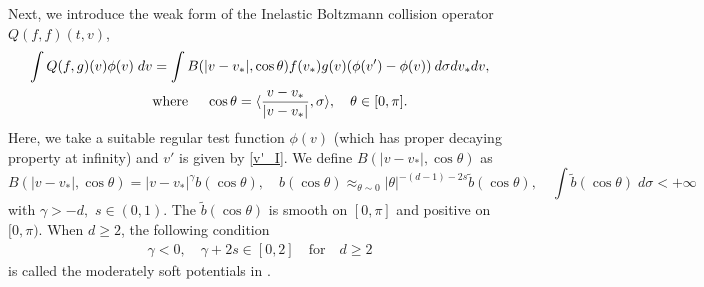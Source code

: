 \documentclass[reqno,10pt]{amsart}
\numberwithin{equation}{section}
\begin{document}
\noindent Next, we introduce the weak form of the Inelastic Boltzmann collision operator $Q(f,f)(t,v)$,
\begin{align} \label{Q_nc_I}
     \int Q(f,g)(v) \phi(v) \; dv &= \int B(|v-v_*|, \cos \theta)f(v_*)g(v)(\phi(v')-\phi(v))\: d\sigma dv_*dv, \notag \\
     \quad &\text{where }\quad \cos\theta = \langle\frac{v-v_*}{|v-v_*|}, \sigma\rangle, \quad \theta \in [0, \pi].
\end{align}
Here, we take a suitable regular test function $\phi(v)$ (which has proper decaying property at infinity) and $v'$ is given by \eqref{v'_I}. We define $B(|v-v_*|, \cos \theta)$ as
\begin{equation} \label{B_nc_I}
    B(|v-v_*|,\cos \theta)=|v-v_*|^{\gamma}b(\cos\theta), \quad b(\cos\theta) \approx_{\theta \sim 0} |\theta|^{-(d-1)-2s} \tilde{b}(\cos\theta), \quad
    \int  \tilde{b}(\cos\theta) \;d\sigma < +\infty
\end{equation} with $\gamma>-d,$\; $s\in(0,1).$ The $\tilde{b}(\cos\theta)$ is smooth on $[0,\pi]$ and positive on $[0,\pi).$
When $d \geq 2$, the following condition  %
\begin{align} \label{soft_I}
    \gamma<0, \quad \gamma+2s \in [0,2] \quad \text{for} \quad d\geq 2
\end{align}
 is called the moderately soft potentials in \cite{IM2020, V2002}. \vspace{7mm}
\end{document}
